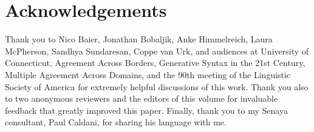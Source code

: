 \documentclass[output=paper
,modfonts
,nonflat]{langsci/langscibook}
\begin{document}
\section*{Acknowledgements}

Thank you to Nico Baier, Jonathan Bobaljik, Anke Himmelreich, Laura McPherson, Sandhya Sundaresan, Coppe van Urk, and audiences at University of Connecticut, Agreement Across Borders, Generative Syntax in the 21st Century, Multiple Agreement Across Domains, and the 90th meeting of the Linguistic Society of America for extremely helpful discussions of this work. Thank you also to two anonymous reviewers and the editors of this volume for invaluable feedback that greatly improved this paper. Finally, thank you to my Senaya consultant, Paul Caldani, for sharing his language with me.

{\sloppy\printbibliography[heading=subbibliography,notkeyword=this]}
\end{document}
